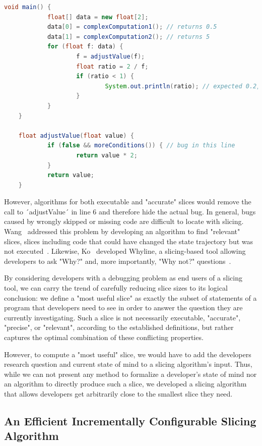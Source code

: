\begin{lstlisting}[float,caption={Code example for accurate slices.},stepnumber=2,numberfirstline=false,label=lst:sliceAccurate,language=Java]
	void main() {
			float[] data = new float[2];
			data[0] = complexComputation1(); // returns 0.5
			data[1] = complexComputation2(); // returns 5
			for (float f: data) {
					f = adjustValue(f);
					float ratio = 2 / f;
					if (ratio < 1) {
							System.out.println(ratio); // expected 0.2, got 0.4
					}
			}
	}

	float adjustValue(float value) {
			if (false && moreConditions()) { // bug in this line
					return value * 2;
			}
			return value;
	}
\end{lstlisting}

However, algorithms for both executable and "accurate" slices would remove the call to ´adjustValue´ in line 6 and therefore hide the actual bug.
In general, bugs caused by wrongly skipped or missing code are difficult to locate with slicing.
Wang \etal\ addressed this problem by developing an algorithm to find "relevant" slices, slices including code that could have changed the state trajectory but was not executed~\cite{wang_08_dynamic_slicing_on_java}.
Likewise, Ko \etal\ developed Whyline, a slicing-based tool allowing developers to ask "Why?" and, more importantly, "Why not?" questions~\cite{ko_08_debugging_reinvented_asking}.

By considering developers with a debugging problem as end users of a slicing tool, we can carry the trend of carefully reducing slice sizes to its logical conclusion: we define a "most useful slice" as exactly the subset of statements of a program that developers need to see in order to answer the question they are currently investigating.
Such a slice is not necessarily executable, "accurate", "precise", or "relevant", according to the established definitions, but rather captures the optimal combination of these conflicting properties.

However, to compute a "most useful" slice, we would have to add the developers research question and current state of mind to a slicing algorithm's input.
Thus, while we can not present any method to formalize a developer's state of mind nor an algorithm to directly produce such a slice, we developed a slicing algorithm that allows developers get arbitrarily close to the smallest slice they need.

\subsection{An Efficient Incrementally Configurable Slicing Algorithm}

